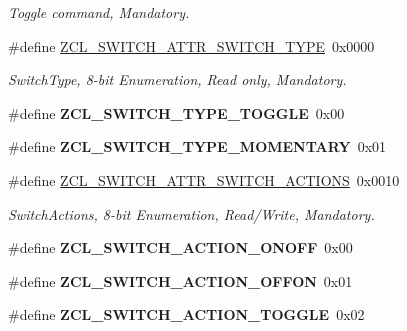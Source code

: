 \begin{DoxyCompactItemize}
\begin{DoxyCompactList}\small\item\em Toggle command, Mandatory. \end{DoxyCompactList}\item 
\mbox{\label{group__zcl__onoff_ga515413fcce31bf79d2bd46fb28c93a2e}} 
\#define \hyperlink{group__zcl__onoff_ga515413fcce31bf79d2bd46fb28c93a2e}{Z\+C\+L\+\_\+\+S\+W\+I\+T\+C\+H\+\_\+\+A\+T\+T\+R\+\_\+\+S\+W\+I\+T\+C\+H\+\_\+\+T\+Y\+PE}~0x0000
\begin{DoxyCompactList}\small\item\em Switch\+Type, 8-\/bit Enumeration, Read only, Mandatory. \end{DoxyCompactList}\item 
\mbox{\label{group__zcl__onoff_ga046e143f5f7685aff4cd2a25ae626bbf}} 
\#define {\bfseries Z\+C\+L\+\_\+\+S\+W\+I\+T\+C\+H\+\_\+\+T\+Y\+P\+E\+\_\+\+T\+O\+G\+G\+LE}~0x00
\item 
\mbox{\label{group__zcl__onoff_ga567b4d099adf0574a0cf616a763528f3}} 
\#define {\bfseries Z\+C\+L\+\_\+\+S\+W\+I\+T\+C\+H\+\_\+\+T\+Y\+P\+E\+\_\+\+M\+O\+M\+E\+N\+T\+A\+RY}~0x01
\item 
\mbox{\label{group__zcl__onoff_ga2ca3d5c19e5422fe71c9389045603a9d}} 
\#define \hyperlink{group__zcl__onoff_ga2ca3d5c19e5422fe71c9389045603a9d}{Z\+C\+L\+\_\+\+S\+W\+I\+T\+C\+H\+\_\+\+A\+T\+T\+R\+\_\+\+S\+W\+I\+T\+C\+H\+\_\+\+A\+C\+T\+I\+O\+NS}~0x0010
\begin{DoxyCompactList}\small\item\em Switch\+Actions, 8-\/bit Enumeration, Read/\+Write, Mandatory. \end{DoxyCompactList}\item 
\mbox{\label{group__zcl__onoff_gaf7aebb04ff54e953ad6fab425b59b82c}} 
\#define {\bfseries Z\+C\+L\+\_\+\+S\+W\+I\+T\+C\+H\+\_\+\+A\+C\+T\+I\+O\+N\+\_\+\+O\+N\+O\+FF}~0x00
\item 
\mbox{\label{group__zcl__onoff_gac32f070ae508e84d80d0d389d24fe5cf}} 
\#define {\bfseries Z\+C\+L\+\_\+\+S\+W\+I\+T\+C\+H\+\_\+\+A\+C\+T\+I\+O\+N\+\_\+\+O\+F\+F\+ON}~0x01
\item 
\mbox{\label{group__zcl__onoff_ga5924f219a203d07537f949e44842dd60}} 
\#define {\bfseries Z\+C\+L\+\_\+\+S\+W\+I\+T\+C\+H\+\_\+\+A\+C\+T\+I\+O\+N\+\_\+\+T\+O\+G\+G\+LE}~0x02
\end{DoxyCompactItemize}

